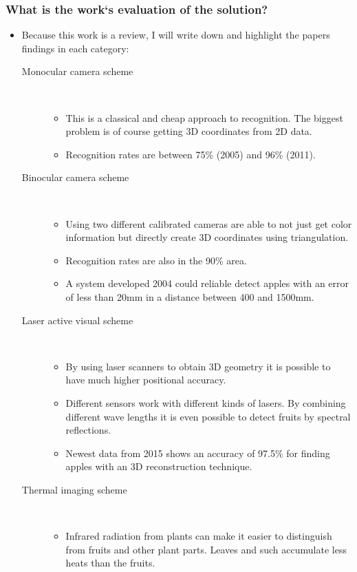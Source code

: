 \subsubsection*{What is the work`s evaluation of the solution?}
\begin{itemize}
    \item Because this work is a review, I will write down and highlight the papers findings in each category:
    \begin{description}
        \item[Monocular camera scheme] \ 
        \begin{itemize} 
            \item This is a classical and cheap approach to recognition. The biggest problem is of course getting 3D coordinates from 2D data.
            \item Recognition rates are between 75\% (2005) and 96\% (2011). 
         \end{itemize}
        \item[Binocular camera scheme] \ 
        \begin{itemize} 
            \item Using two different calibrated cameras are able to not just get color information but directly create 3D coordinates using triangulation.
            \item Recognition rates are also in the 90\% area. 
            \item A system developed 2004 could reliable detect apples with an error of  less than 20mm in a distance between 400 and 1500mm.
         \end{itemize}
        \item[Laser active visual scheme] \ 
        \begin{itemize} 
            \item By using laser scanners to obtain 3D geometry it is possible to have much higher positional accuracy.
            \item Different sensors work with different kinds of lasers. By combining different wave lengths it is even possible to detect fruits by spectral reflections.
            \item Newest data from 2015 shows an accuracy of 97.5\% for finding apples with an 3D reconstruction technique.
         \end{itemize}
        \item[Thermal imaging scheme] \ 
        \begin{itemize} 
            \item Infrared radiation from plants can make it easier to distinguish from fruits and other plant parts. Leaves and such accumulate less heats than the fruits.

\end{itemize}
\end{description}
\end{itemize}
